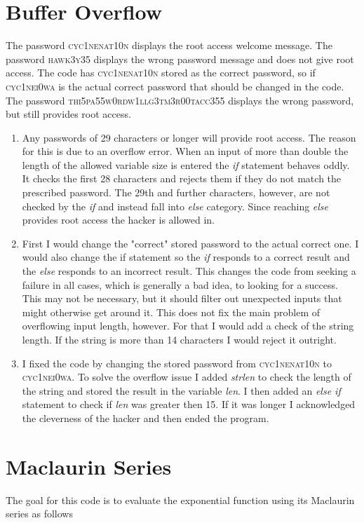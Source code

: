 \documentclass{article}
\begin{document}
\section{Buffer Overflow}
The password \textsc{cyc1nenat10n} displays the root access welcome message. The password \textsc{hawk3y35} displays the wrong password message and does not give root access. The code has \textsc{cyc1nenat10n} stored as the correct password, so if \textsc{cyc1nei0wa} is the actual correct password that should be changed in the code. The password \textsc{thi5pa55w0rdw1llg3tm3r00tacc355} displays the wrong password, but still provides root access.

\begin{enumerate}
    \item Any passwords of 29 characters or longer will provide root access. The reason for this is due to an overflow error. When an input of more than double the length of the allowed variable size is entered the \textit{if} statement behaves oddly. It checks the first 28 characters and rejects them if they do not match the prescribed password. The 29th and further characters, however, are not checked by the \textit{if} and instead fall into \textit{else} category. Since reaching \textit{else} provides root access the hacker is allowed in.
    \item First I would change the "correct" stored password to the actual correct one. I would also change the if statement so the \textit{if} responds to a correct result and the \textit{else} responds to an incorrect result. This changes the code from seeking a failure in all cases, which is generally a bad idea, to looking for a success. This may not be necessary, but it should filter out unexpected inputs that might otherwise get around it. This does not fix the main problem of overflowing input length, however. For that I would add a check of the string length. If the string is more than 14 characters I would reject it outright.
    \item I fixed the code by changing the stored password from \textsc{cyc1nenat10n} to \textsc{cyc1nei0wa}. To solve the overflow issue I added \textit{strlen} to check the length of the string and stored the result in the variable \textit{len}. I then added an \textit{else if} statement to check if \textit{len} was greater then 15. If it was longer I acknowledged the cleverness of the hacker and then ended the program.
\end{enumerate}

\section{Maclaurin Series}
The goal for this code is to evaluate the exponential function using its Maclaurin series as follows
\end{document}
